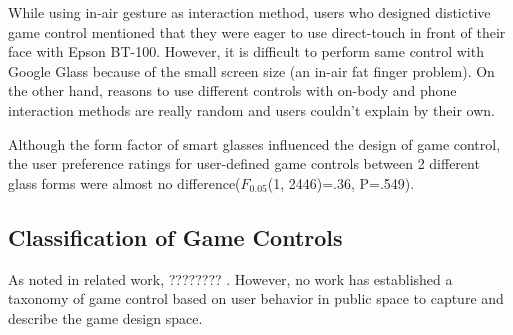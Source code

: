 \documentclass{sigchi}
\begin{document}
  While using in-air gesture as interaction method, users who designed distictive game control mentioned that they were eager to use direct-touch in front of their face with Epson BT-100. However, it is difficult to perform same control with Google Glass because of the small screen size (an in-air fat finger problem). On the other hand, reasons to use different controls with on-body and phone interaction methods are really random and users couldn't explain by their own.

  Although the form factor of smart glasses influenced the design of game control, the user preference ratings for user-defined game controls between 2 different glass forms were almost no difference($F_{0.05}$(1, 2446)=.36, P=.549).


  \subsection{Classification of Game Controls}
  As noted in related work, ???????? . However, no work has established a taxonomy of game control based on user behavior in public space to capture and describe the game design space.
\end{document}
